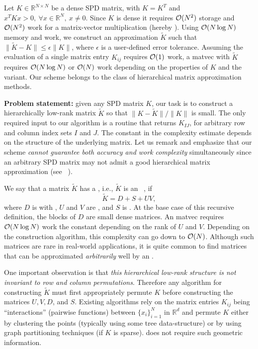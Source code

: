 Let $K \in \mathbb{R}^{N\times N}$ be a dense SPD matrix, with $K=K^T$ and $x^T
K x > 0,\ \forall x\in \mathbb{R}^N,\ x \neq 0$. Since $K$ is dense it requires $\operatorname{\mathcal{O}}(N^2)$ storage  and $\operatorname{\mathcal{O}}(N^2)$ work for a matrix-vector multiplication (hereby ). Using $\operatorname{\mathcal{O}}(N\log N)$ memory and work, we construct an approximation $\tilde{K}$ such that $\|\tilde{K}-K\| \leq \epsilon \|K\|$, where $\epsilon$ is a user-defined error tolerance. Assuming the evaluation of a single matrix entry $K_{ij}$ requires $\operatorname{\mathcal{O}}(1)$ work, a matvec  with $\tilde{K}$  requires $\operatorname{\mathcal{O}}(N \log N)$ or $\operatorname{\mathcal{O}}(N)$ work depending on the properties of $K$ and the \gofmm{} variant. Our scheme belongs to the class of hierarchical matrix approximation methods.

{\bf Problem statement:} given any SPD matrix $K$, our task is to construct a hierarchically low-rank matrix $\tilde{K}$ so that $\|K-\tilde{K}\|/\|K\|$ is small.  The only required input to our algorithm is a routine that returns $K_{IJ}$, for arbitrary row and column index sets $I$ and $J$. The constant in the complexity estimate depends on the structure of the underlying matrix. Let us remark and emphasize that our scheme \emph{cannot guarantee both accuracy and work complexity} simultaneously since an arbitrary SPD matrix may not admit a good hierarchical matrix  approximation (see ~). 

We say that a matrix $\tilde{K}$ has a , i.e., $\tilde{K}$ is an \hmatrix{}~\cite{hackbusch15,bebendorf08}, if 
\begin{equation}\label{e:hmatrix}
\tilde{K}=D+S+UV,
\end{equation}
where $D$ is  with , $U$ and $V$  are
, and $S$ is .  At the base case of this
recursive definition, the blocks of $D$ are small dense matrices. An \hmatrix{}
matvec requires $\operatorname{\mathcal{O}}(N \log N)$ work the constant depending on the rank of
$U$ and $V$. Depending on the construction algorithm, this complexity can go down to $\operatorname{\mathcal{O}}(N)$. Although such matrices are rare in real-world  applications, it is quite common to find matrices that  can be approximated \emph{arbitrarily} well by an \hmatrix{}.

One important observation is that \emph{this hierarchical low-rank structure  is not invariant to row and column permutations}. Therefore any algorithm for constructing $\tilde{K}$ must first appropriately permute $K$ before constructing the matrices $U, V, D$, and $S$. Existing algorithms  rely on the matrix entries $K_{ij}$ being ``interactions'' (pairwise functions) between  $\{x_i\}_{i=1}^N$ in $\mathbb{R}^d$ and permute $K$ either by clustering the points (typically using some tree data-structure) or by using graph partitioning techniques (if $K$ is sparse). \gofmm{} does not require such geometric information. 

